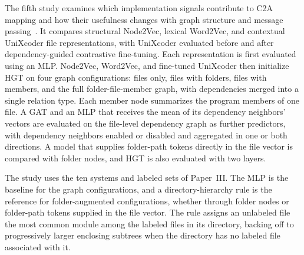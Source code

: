 The fifth study examines which implementation signals contribute to C2A mapping and how their usefulness changes with graph structure and message passing~\cite{hetmap}. It compares structural Node2Vec, lexical Word2Vec, and contextual UniXcoder file representations, with UniXcoder evaluated before and after dependency-guided contrastive fine-tuning. Each representation is first evaluated using an MLP. Node2Vec, Word2Vec, and fine-tuned UniXcoder then initialize HGT on four graph configurations: files only, files with folders, files with members, and the full folder-file-member graph, with dependencies merged into a single relation type. Each member node summarizes the program members of one file. A GAT and an MLP that receives the mean of its dependency neighbors' vectors are evaluated on the file-level dependency graph as further predictors, with dependency neighbors enabled or disabled and aggregated in one or both directions. A model that supplies folder-path tokens directly in the file vector is compared with folder nodes, and HGT is also evaluated with two layers.


The study uses the ten systems and labeled sets of Paper~III. The MLP is the baseline for the graph configurations, and a directory-hierarchy rule is the reference for folder-augmented configurations, whether through folder nodes or folder-path tokens supplied in the file vector. The rule assigns an unlabeled file the most common module among the labeled files in its directory, backing off to progressively larger enclosing subtrees when the directory has no labeled file associated with it.